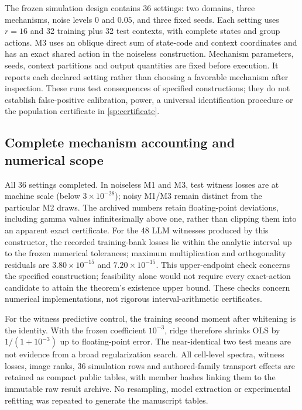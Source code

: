 The frozen simulation design contains 36 settings: two domains, three mechanisms, noise levels $0$ and $0.05$, and three fixed seeds. Each setting uses $r=16$ and 32 training plus 32 test contexts, with complete states and group actions. M3 uses an oblique direct sum of state-code and context coordinates and has an exact shared action in the noiseless construction. Mechanism parameters, seeds, context partitions and output quantities are fixed before execution. It reports each declared setting rather than choosing a favorable mechanism after inspection. These runs test consequences of specified constructions; they do not establish false-positive calibration, power, a universal identification procedure or the population certificate in \cref{sp:certificate}.


\subsection{Complete mechanism accounting and numerical scope}

All 36 settings completed. In noiseless M1 and M3, test witness losses are at machine scale (below $3\times10^{-28}$); noisy M1/M3 remain distinct from the particular M2 draws. The archived numbers retain floating-point deviations, including gamma values infinitesimally above one, rather than clipping them into an apparent exact certificate. For the 48 LLM witnesses produced by this constructor, the recorded training-bank losses lie within the analytic interval up to the frozen numerical tolerances; maximum multiplication and orthogonality residuals are $3.80\times10^{-15}$ and $7.20\times10^{-15}$. This upper-endpoint check concerns the specified construction; feasibility alone would not require every exact-action candidate to attain the theorem's existence upper bound. These checks concern numerical implementations, not rigorous interval-arithmetic certificates.

For the witness predictive control, the training second moment after whitening is the identity. With the frozen coefficient $10^{-3}$, ridge therefore shrinks OLS by $1/(1+10^{-3})$ up to floating-point error. The near-identical two test means are not evidence from a broad regularization search. All cell-level spectra, witness losses, image ranks, 36 simulation rows and authored-family transport effects are retained as compact public tables, with member hashes linking them to the immutable raw result archive. No resampling, model extraction or experimental refitting was repeated to generate the manuscript tables.


